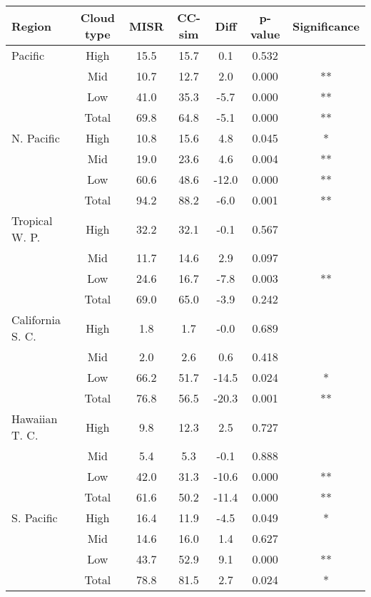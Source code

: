 \begin{tabular}{lcccccc}
\hline\hline
Region & Cloud type &  MISR & CC-sim &  Diff & p-value & Significance \\ \hline
   Pacific &       High &  15.5 &  15.7 &   0.1 & 0.532 &       \\
           &        Mid &  10.7 &  12.7 &   2.0 & 0.000 &    ** \\
           &        Low &  41.0 &  35.3 &  -5.7 & 0.000 &    ** \\
           &      Total &  69.8 &  64.8 &  -5.1 & 0.000 &    ** \\
\hline
N. Pacific &       High &  10.8 &  15.6 &   4.8 & 0.045 &     * \\
           &        Mid &  19.0 &  23.6 &   4.6 & 0.004 &    ** \\
           &        Low &  60.6 &  48.6 & -12.0 & 0.000 &    ** \\
           &      Total &  94.2 &  88.2 &  -6.0 & 0.001 &    ** \\
\hline
Tropical W. P. &       High &  32.2 &  32.1 &  -0.1 & 0.567 &       \\
           &        Mid &  11.7 &  14.6 &   2.9 & 0.097 &       \\
           &        Low &  24.6 &  16.7 &  -7.8 & 0.003 &    ** \\
           &      Total &  69.0 &  65.0 &  -3.9 & 0.242 &       \\
\hline
California S. C. &       High &   1.8 &   1.7 &  -0.0 & 0.689 &       \\
           &        Mid &   2.0 &   2.6 &   0.6 & 0.418 &       \\
           &        Low &  66.2 &  51.7 & -14.5 & 0.024 &     * \\
           &      Total &  76.8 &  56.5 & -20.3 & 0.001 &    ** \\
\hline
Hawaiian T. C. &       High &   9.8 &  12.3 &   2.5 & 0.727 &       \\
           &        Mid &   5.4 &   5.3 &  -0.1 & 0.888 &       \\
           &        Low &  42.0 &  31.3 & -10.6 & 0.000 &    ** \\
           &      Total &  61.6 &  50.2 & -11.4 & 0.000 &    ** \\
\hline
S. Pacific &       High &  16.4 &  11.9 &  -4.5 & 0.049 &     * \\
           &        Mid &  14.6 &  16.0 &   1.4 & 0.627 &       \\
           &        Low &  43.7 &  52.9 &   9.1 & 0.000 &    ** \\
           &      Total &  78.8 &  81.5 &   2.7 & 0.024 &     * \\
\hline
\end{tabular}
